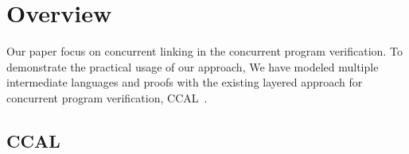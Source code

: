 \section{Overview}
\label{sec:overview}




Our paper focus on 
concurrent linking in the concurrent program verification. 
To demonstrate the practical usage of our approach,
We have modeled 
multiple intermediate languages 
and proofs 
with the existing layered approach for concurrent program verification, CCAL~\cite{ccal}.

\newcommand{\envcontext}{\varepsilon}
\newcommand{\layerdef}{\mathcal{L}}
\newcommand{\relyrule}{\mathcal{R}}
\newcommand{\guaranteerule}{\mathcal{G}}
\newcommand{\primid}{id}
\newcommand{\primspeckwd}{{\sigma}}
\newcommand{\primspec}[1]{\primspeckwd{#1}}
\newcommand{\igchar}{\_}
\newcommand{\registers}{{r}}

\subsection{CCAL}
\label{subsec:ccal}



